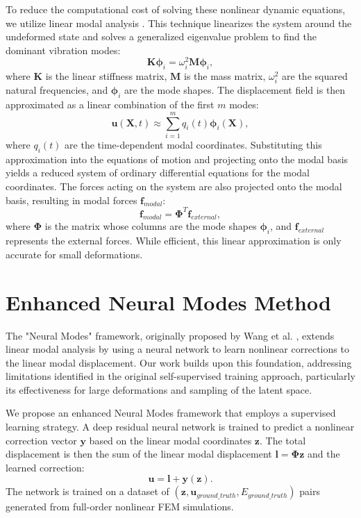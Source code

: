 \documentclass[11pt,a4paper,twocolumn]{article}
\begin{document}
To reduce the computational cost of solving these nonlinear dynamic equations, we utilize linear modal analysis \cite{Pentland_Williams_1989}. This technique linearizes the system around the undeformed state and solves a generalized eigenvalue problem to find the dominant vibration modes:
\begin{equation}
    \bm{K} \bm{\phi}_i = \omega_i^2 \bm{M} \bm{\phi}_i,
\label{eq:es:eigenvalue_problem}
\end{equation}
where $\bm{K}$ is the linear stiffness matrix, $\bm{M}$ is the mass matrix, $\omega_i^2$ are the squared natural frequencies, and $\bm{\phi}_i$ are the mode shapes. The displacement field is then approximated as a linear combination of the first $m$ modes:
\begin{equation}
    \bm{u}(\bm{X},t) \approx \sum_{i=1}^{m} q_i(t) \bm{\phi}_i(\bm{X}),
\label{eq:es:modal_decomposition}
\end{equation}
where $q_i(t)$ are the time-dependent modal coordinates. Substituting this approximation into the equations of motion and projecting onto the modal basis yields a reduced system of ordinary differential equations for the modal coordinates. The forces acting on the system are also projected onto the modal basis, resulting in modal forces $\bm{f}_{modal}$:
\begin{equation}
    \bm{f}_{modal} = \bm{\Phi}^T \bm{f}_{external},
\label{eq:es:modal_forces}
\end{equation}
where $\bm{\Phi}$ is the matrix whose columns are the mode shapes $\bm{\phi}_i$, and $\bm{f}_{external}$ represents the external forces. While efficient, this linear approximation is only accurate for small deformations.

\section{Enhanced Neural Modes Method}
\label{sec:es:enhanced_neural_modes}

The "Neural Modes" framework, originally proposed by Wang et al. \cite{Wang_Du_Coros_Thomaszewski_2024}, extends linear modal analysis by using a neural network to learn nonlinear corrections to the linear modal displacement. Our work builds upon this foundation, addressing limitations identified in the original self-supervised training approach, particularly its effectiveness for large deformations and sampling of the latent space.

We propose an enhanced Neural Modes framework that employs a supervised learning strategy. A deep residual neural network is trained to predict a nonlinear correction vector $\bm{y}$ based on the linear modal coordinates $\bm{z}$. The total displacement is then the sum of the linear modal displacement $\bm{l} = \bm{\Phi} \bm{z}$ and the learned correction:
\begin{equation}
    \bm{u} = \bm{l} + \bm{y}(\bm{z}).
\label{eq:es:total_displacement}
\end{equation}
The network is trained on a dataset of $(\bm{z}, \bm{u}_{ground\_truth}, E_{ground\_truth})$ pairs generated from full-order nonlinear FEM simulations.
\end{document}
